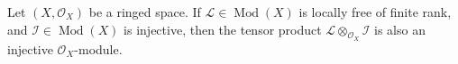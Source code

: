 Let $(X,\mathcal{O}_X)$ be a ringed space. If $\mathcal{L} \in \operatorname{Mod}(X)$ is locally free of finite rank, and $\mathcal{I} \in \operatorname{Mod}(X)$ is injective, then the tensor product $\mathcal{L} \otimes_{\mathcal{O}_X} \mathcal{I}$ is also an injective $\mathcal{O}_X$-module.
